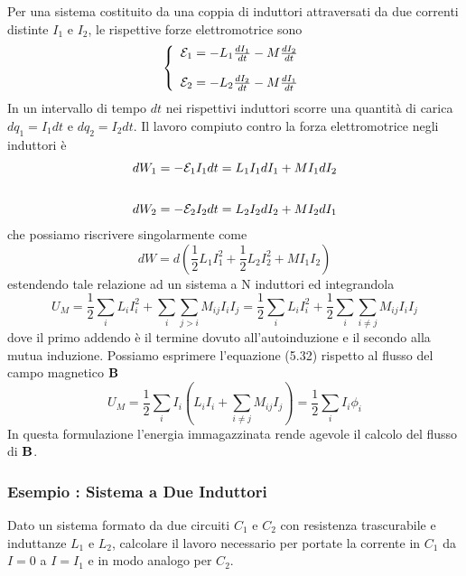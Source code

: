 Per una sistema costituito da una coppia di induttori attraversati da due correnti distinte $I_1$ e $I_2$, le rispettive forze elettromotrice sono 
\begin{align*}
	\left \{ \begin{array}{l}
 	\mathcal{E}_1 = - L_1 \frac{d I_1}{dt} - M \frac{dI_2}{dt} \\ \rule{0pt}{20pt}
 	\mathcal{E}_2 = - L_2 \frac{d I_2}{dt} - M \frac{d I_1}{dt}
 \end{array}\right.
\end{align*}
In un intervallo di tempo $dt$ nei rispettivi induttori scorre una quantit\`a di carica $dq_1 = I_1dt$ e $dq_2 = I_2 dt$. Il lavoro compiuto contro la forza elettromotrice negli induttori \`e 
\begin{align*}
	& dW_1 = - \mathcal{E}_1 I_1 dt = L_1 I_1 dI_1 + MI_1dI_2 \\ \rule{0pt}{25pt}
	& dW_2 = - \mathcal{E}_2 I_2 dt = L_2 I_2 d I_2 + MI_2 dI_1 
\end{align*}
che possiamo riscrivere singolarmente come 
\begin{equation*}
	dW = d \left( \frac{1}{2} L_1 I_1^2 + \frac{1}{2} L_2 I_2^2 + MI_1I_2\right)
\end{equation*}
estendendo tale relazione ad un sistema a N induttori ed integrandola 
\begin{equation}
	U_M =\frac{1}{2}\sum_{i} L_i I_i^2 + \sum_{i}\sum_{j > i}M_{ij}I_iI_j = \frac{1}{2}\sum_{i} L_i I_i^2 + \frac{1}{2} \sum_{i} \sum_{i \neq j} M_{ij}I_iI_j
\end{equation}
dove il primo addendo \`e il termine dovuto all'autoinduzione e il secondo alla mutua induzione. Possiamo esprimere l'equazione (5.32) rispetto al flusso del campo magnetico $\bold{B}$
\begin{equation}
	U_M =\frac{1}{2}\sum_i I_i \left(L_i I_i + \sum_{i \neq j}  M_{ij}I_j\right) = \frac{1}{2} \sum_{i}I_i \phi_i
\end{equation}
In questa formulazione l'energia immagazzinata rende agevole il calcolo del flusso di $\bold{B}$.

\subsubsection{Esempio : Sistema a Due Induttori}


Dato un sistema formato da due circuiti $C_1$ e $C_2$ con resistenza trascurabile e induttanze $L_1$ e $L_2$, calcolare il lavoro necessario per portate  la corrente in $C_1$ da $I= 0$ a $I = I_1$ e in modo analogo per $C_2$.


